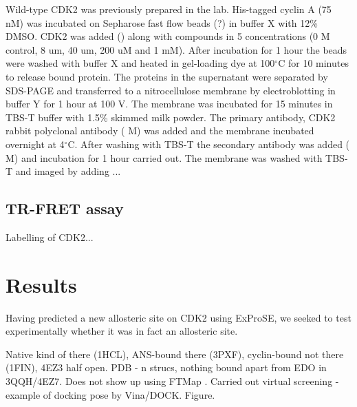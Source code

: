 Wild-type CDK2 was previously prepared in the lab.
His-tagged cyclin A (75 nM) was incubated on Sepharose fast flow beads (?) in buffer X with 12\% DMSO.
CDK2 was added () along with compounds in 5 concentrations (0 M control, 8 um, 40 um, 200 uM and 1 mM).
After incubation for 1 hour the beads were washed with buffer X and heated in gel-loading dye at 100$^{\circ}$C for 10 minutes to release bound protein.
The proteins in the supernatant were separated by SDS-PAGE and transferred to a nitrocellulose membrane by electroblotting in buffer Y for 1 hour at 100 V.
The membrane was incubated for 15 minutes in TBS-T buffer with 1.5\% skimmed milk powder.
The primary antibody, CDK2 rabbit polyclonal antibody ( M) was added and the membrane incubated overnight at 4$^{\circ}$C.
After washing with TBS-T the secondary antibody was added ( M) and incubation for 1 hour carried out.
The membrane was washed with TBS-T and imaged by adding ...


\subsection{TR-FRET assay}

Labelling of CDK2...


\section{Results}

Having predicted a new allosteric site on CDK2 using ExProSE, we seeked to test experimentally whether it was in fact an allosteric site.

Native kind of there (1HCL), ANS-bound there (3PXF), cyclin-bound not there (1FIN), 4EZ3 half open.
PDB - n strucs, nothing bound apart from EDO in 3QQH/4EZ7.
Does not show up using FTMap \cite{Kozakov2015}.
Carried out virtual screening - example of docking pose by Vina/DOCK.
Figure.


